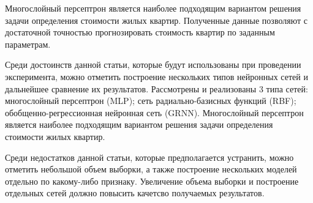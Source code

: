Многослойный персептрон является наиболее подходящим вариантом решения задачи определения стоимости жилых квартир.
Полученные данные позволяют с достаточной точностью прогнозировать стоимость квартир по заданным параметрам.

Среди достоинств данной статьи, которые будут использованы при проведении эксперимента,
можно отметить построение нескольких типов нейронных сетей и дальнейшее сравнение их результатов.
Рассмотрены и реализованы 3 типа сетей: многослойный персептрон (MLP); сеть радиально-базисных функций (RBF);
обобщенно-регрессионная нейронная сеть (GRNN). Многослойный персептрон является наиболее подходящим вариантом решения
задачи определения стоимости жилых квартир.

Среди недостатков данной статьи, которые предполагается устранить, можно отметить небольшой объем выборки, а также 
построение нескольких моделей отдельно по какому-либо признаку. Увеличение объема выборки и построение отдельных сетей
должно повысить качетсво получаемых результатов.
